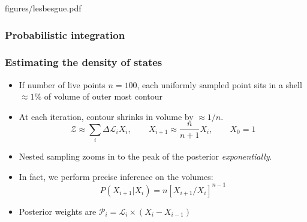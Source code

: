 \documentclass[%
    handout
]{beamer}
\newcommand{\lik}{\mathcal{L}}
\newcommand{\ev}{\mathcal{Z}}
\begin{document}
\begin{multifig}{figures/lesbesgue.pdf}
    \frametitle{Probabilistic integration}
\end{multifig}

\begin{frame}
    \frametitle{Estimating the density of states} 

    \begin{itemize}
        \item If number of live points $n=100$, each uniformly sampled point sits in a shell $\approx 1\%$ of volume of outer most contour
        \item At each iteration, contour shrinks in volume by  $\approx 1/n$.
            \begin{equation}
                \ev \approx \sum_i \Delta\lik_i X_{i},\qquad
                X_{i+1} \approx \frac{n}{n+1}X_i, \qquad X_{0} = 1
                \nonumber
            \end{equation}
        \item Nested sampling zooms in to the peak of the posterior {\em exponentially}.
        \item In fact, we perform precise inference on the volumes:
            \begin{equation}
                P(X_{i+1}|X_{i}) = n{[X_{i+1}/X_{i}]}^{n-1}
                \nonumber
            \end{equation}
        \item Posterior weights are $\mathcal{P}_i = \mathcal{L}_i\times (X_i-X_{i-1})$
    \end{itemize}
\end{frame}
\end{document}
